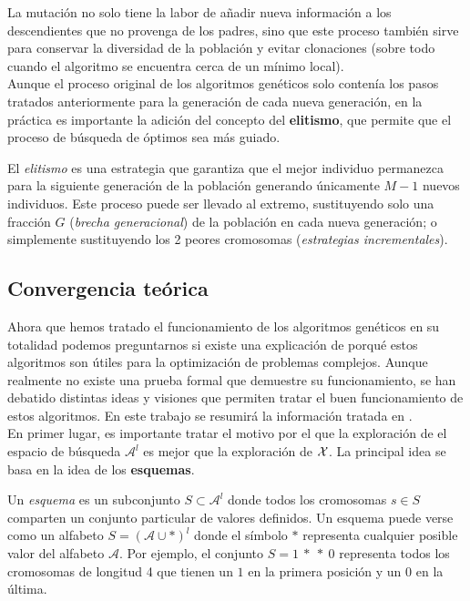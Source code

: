 La mutación no solo tiene la labor de añadir nueva información a los descendientes que no provenga de los padres, sino que este proceso también sirve para conservar la diversidad de la población y evitar clonaciones (sobre todo cuando el algoritmo se encuentra cerca de un mínimo local).\\

Aunque el proceso original de los algoritmos genéticos solo contenía los pasos tratados anteriormente para la generación de cada nueva generación, en la práctica es importante la adición del concepto del \textbf{elitismo}, que permite que el proceso de búsqueda de óptimos sea más guiado.

\begin{definition}
    El \textit{elitismo} es una estrategia que garantiza que el mejor individuo permanezca para la siguiente generación de la población generando únicamente $M-1$ nuevos individuos. Este proceso puede ser llevado al extremo, sustituyendo solo una fracción $G$ (\textit{brecha generacional}) de la población en cada nueva generación; o simplemente sustituyendo los 2 peores cromosomas (\textit{estrategias incrementales}).
\end{definition}
\subsection{Convergencia teórica}\label{geneticos-conv}
Ahora que hemos tratado el funcionamiento de los algoritmos genéticos en su totalidad podemos preguntarnos si existe una explicación de porqué estos algoritmos son útiles para la optimización de problemas complejos. Aunque realmente no existe una prueba formal que demuestre su funcionamiento, se han debatido distintas ideas y visiones que permiten tratar el buen funcionamiento de estos algoritmos. En este trabajo se resumirá la información tratada en \cite{reeves-2002}.\\

En primer lugar, es importante tratar el motivo por el que la exploración de el espacio de búsqueda $\mathscr{A}^l$ es mejor que la exploración de $\mathcal{X}$. La principal idea se basa en la idea de los \textbf{esquemas}.

\begin{definition}
    Un \textit{esquema} es un subconjunto $S\subset \mathscr{A}^l$ donde todos los cromosomas $s\in S$ comparten un conjunto particular de valores definidos. Un esquema puede verse como un alfabeto $S=(\mathscr{A}\cup *)^l$ donde el símbolo $*$ representa cualquier posible valor del alfabeto $\mathscr{A}$. Por ejemplo, el conjunto $S=1\ *\ *\ 0$ representa todos los cromosomas de longitud 4 que tienen un $1$ en la primera posición y un $0$ en la última.
\end{definition}

